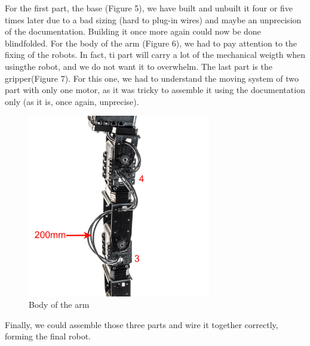 \documentclass[aps,letterpaper,11pt]{revtex4}
\begin{document}
For the first part, the base (Figure 5), we have built and unbuilt it four or five times later due to a bad sizing (hard to plug-in wires) and maybe an unprecision of the documentation. Building it once more again could now be done blindfolded.
For the body of the arm (Figure 6), we had to pay attention to the fixing of the robots. In fact, ti part will carry a lot of the mechanical weigth when usingthe robot, and we do not want it to overwhelm.
The last part is the gripper(Figure 7). For this one, we had to understand the moving system of two part with only one motor, as it was tricky to assemble it using the documentation only (as it is, once again, unprecise).
\begin{figure}[h]
	\centering
	\includegraphics[height=8cm]{wire2.jpg}
	\caption{Body of the arm}
	\label{fig:Middle}    
\end{figure}

Finally, we could assemble those three parts and wire it together correctly, forming the final robot.
\end{document}
